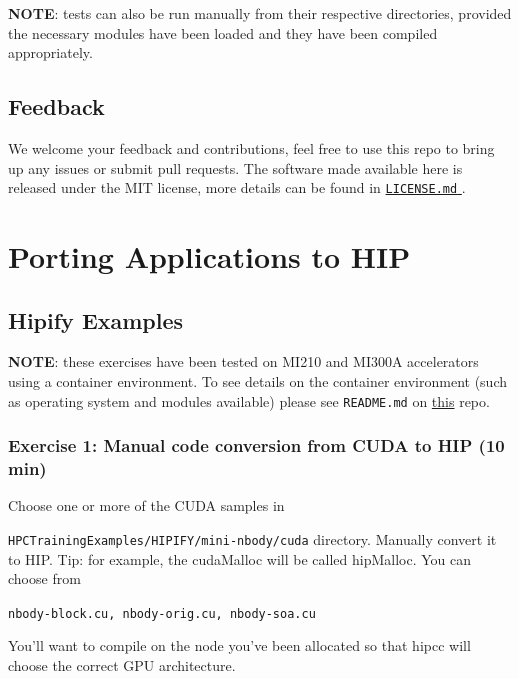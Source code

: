 \documentclass[
]{article}
\let\oldtexttt\texttt
\renewcommand{\texttt}[1]{
  \colorbox{Light}{\oldtexttt{#1}}
}
\begin{document}
\textbf{NOTE}: tests can also be run manually from their respective
directories, provided the necessary modules have been loaded and they
have been compiled appropriately.

\hypertarget{feedback}{%
\subsection{Feedback}\label{feedback}}

We welcome your feedback and contributions, feel free to use this repo
to bring up any issues or submit pull requests. The software made
available here is released under the MIT license, more details can be
found in
\href{https://github.com/amd/HPCTrainingExamples/blob/main/LICENSE.md}{\texttt{LICENSE.md}}.

\pagebreak

\hypertarget{porting-applications-to-hip}{%
\section{Porting Applications to
HIP}\label{porting-applications-to-hip}}

\hypertarget{hipify-examples}{%
\subsection{Hipify Examples}\label{hipify-examples}}

\textbf{NOTE}: these exercises have been tested on MI210 and MI300A
accelerators using a container environment. To see details on the
container environment (such as operating system and modules available)
please see \texttt{README.md} on
\href{https://github.com/amd/HPCTrainingDock}{this} repo.

\hypertarget{exercise-1-manual-code-conversion-from-cuda-to-hip-10-min}{%
\subsubsection{Exercise 1: Manual code conversion from CUDA to HIP (10
min)}\label{exercise-1-manual-code-conversion-from-cuda-to-hip-10-min}}

Choose one or more of the CUDA samples in
\texttt{HPCTrainingExamples/HIPIFY/mini-nbody/cuda} directory. Manually
convert it to HIP. Tip: for example, the cudaMalloc will be called
hipMalloc. You can choose from
\texttt{nbody-block.cu,\ nbody-orig.cu,\ nbody-soa.cu}

You'll want to compile on the node you've been allocated so that hipcc
will choose the correct GPU architecture.
\end{document}

